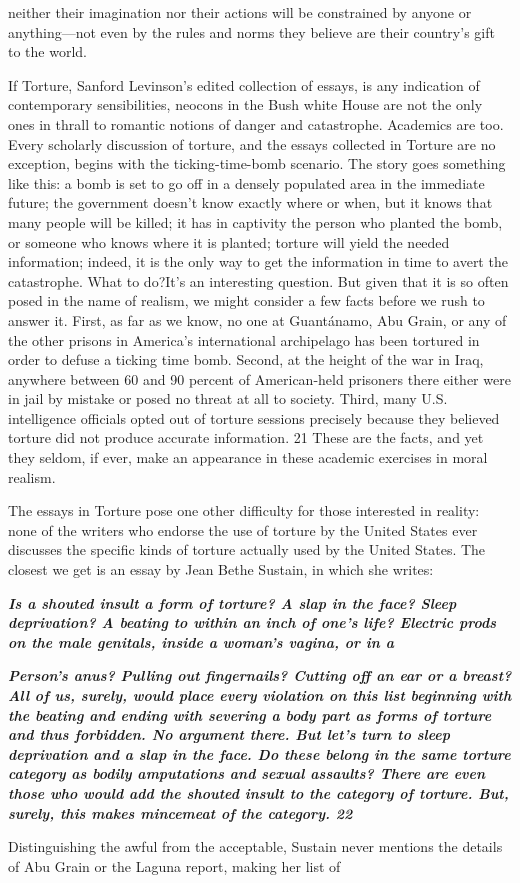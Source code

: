 neither their imagination nor their actions will be constrained by anyone or anything—not even by the rules and norms they believe are their country’s gift to the world.{\par} If Torture, Sanford Levinson’s edited collection of essays, is any indication of contemporary sensibilities, neocons in the Bush white House are not the only ones in thrall to romantic notions of danger and catastrophe. Academics are too. Every scholarly discussion of torture, and the essays collected in Torture are no exception, begins with the ticking-time-bomb scenario. The story goes something like this: a bomb is set to go off in a densely populated area in the immediate future; the government doesn’t know exactly where or when, but it knows that many people will be killed; it has in captivity the person who planted the bomb, or someone who knows where it is planted; torture will yield the needed information; indeed, it is the only way to get the information in time to avert the catastrophe. What to do?It’s an interesting question. But given that it is so often posed in the name of realism, we might consider a few facts before we rush to answer it. First, as far as we know, no one at Guantánamo, Abu Grain, or any of the other prisons in America’s international archipelago has been tortured in order to defuse a ticking time bomb. Second, at the height of the war in Iraq, anywhere between {\color{blue} 60 } and {\color{blue} 90 } percent of American-held prisoners there either were in jail by mistake or posed no threat at all to society. Third, many U.S. intelligence officials opted out of torture sessions precisely because they believed torture did not produce accurate information. {\color{blue} 21 } These are the facts, and yet they seldom, if ever, make an appearance in these academic exercises in moral realism.{\par} The essays in Torture pose one other difficulty for those interested in reality: none of the writers who endorse the use of torture by the United States ever discusses the specific kinds of torture actually used by the United States. The closest we get is an essay by Jean Bethe Sustain, in which she writes:{\par} {\textbf{\textit{Is a shouted insult a form of torture? A slap in the face? Sleep deprivation? A beating to within an inch of one’s life? Electric prods on the male genitals, inside a woman’s vagina, or in a} } }{\par} {\par} {\textbf{\textit{Person’s anus? Pulling out fingernails? Cutting off an ear or a breast? All of us, surely, would place every violation on this list beginning with the beating and ending with severing a body part as forms of torture and thus forbidden. No argument there. But let’s turn to sleep deprivation and a slap in the face. Do these belong in the same torture category as bodily amputations and sexual assaults? There are even those who would add the shouted insult to the category of torture. But, surely, this makes mincemeat of the category. {\color{blue} 22 } } } }{\par} Distinguishing the awful from the acceptable, Sustain never mentions the details of Abu Grain or the Laguna report, making her list of 